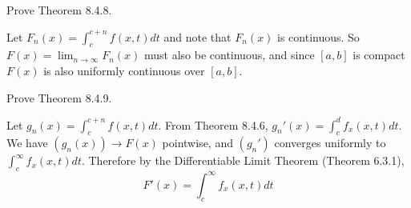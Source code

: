\begin{exercise}
Prove Theorem 8.4.8.
\end{exercise}
\begin{solution}
Let \(F_n(x) = \int_c^{c+n} f(x,t)dt\) and note that \(F_n(x)\) is continuous. So
\(F(x) = \lim_{n \to \infty} F_n(x)\) must also be continuous, and since \([a,b]\) is compact \(F(x)\) is also uniformly continuous over \([a,b]\).
\end{solution}

\begin{exercise}
    Prove Theorem 8.4.9.
\end{exercise}
\begin{solution}
Let \(g_n(x) = \int_c^{c+n} f(x,t) dt\). From Theorem 8.4.6, \(g_n'(x) = \int_c^d f_x(x,t) dt\). We have \((g_n(x)) \to F(x)\) pointwise, and \((g_n')\) converges uniformly to \(\int_c^\infty f_x(x,t) dt\). Therefore by the Differentiable Limit Theorem (Theorem 6.3.1),
\[F'(x) = \int_c^\infty f_x(x,t) dt\]
\end{solution}
